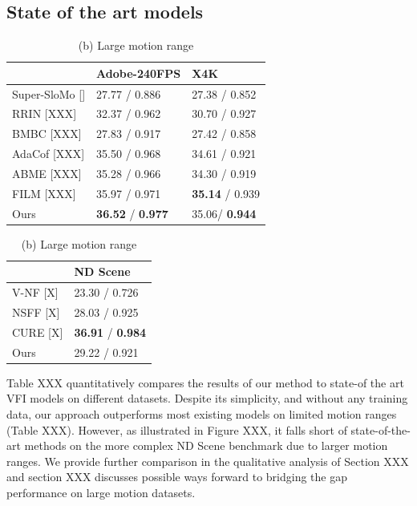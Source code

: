\documentclass{article}
\begin{document}
\subsection{State of the art models}
\label{sec_sota}

\begin{table}[!hb]
    \caption{Quantitative comparison to state-of-the-art VFI on Standard benchmarks. Results are formatted as PSNR / SSMI.}
    \begin{minipage}{.5\linewidth}
      \centering
      \caption*{(a) Limited motion range}
      \begin{tabular}[t]{l | l | l }
       &  Adobe-240FPS &  X4K  \\
      \hline
      Super-SloMo [] &  27.77 / 0.886 & 27.38 / 0.852  \\
      RRIN [XXX]  & 32.37 / 0.962 & 30.70 / 0.927  \\
      BMBC [XXX]  & 27.83 / 0.917 & 27.42 / 0.858   \\
      AdaCof [XXX] & 35.50 / 0.968 & 34.61 / 0.921 \\
      ABME   [XXX] & 35.28 / 0.966 & 34.30 / 0.919 \\
      FILM   [XXX] &	35.97 / 0.971 & \textbf{35.14} / 0.939 \\
      Ours	& \textbf{36.52} / \textbf{0.977} & 35.06/ \textbf{0.944} \\
      \end{tabular}
    \end{minipage}%
    \begin{minipage}{.5\linewidth}
      \centering
      \caption*{(b) Large motion range}
        \begin{tabular}[t]{l | l }
        	    &   ND Scene  \\
        \hline
        V-NF [X]   &  23.30 / 0.726 \\
        NSFF [X]   & 28.03 / 0.925 \\
        CURE [X]   & \textbf{36.91} / \textbf{0.984} \\
        Ours	     & 29.22 / 0.921
        \end{tabular}
    \end{minipage}
\end{table}

Table XXX quantitatively compares the results of our method to state-of the art VFI models on different datasets.
Despite its simplicity, and without any training data, our approach outperforms most existing models on limited motion ranges (Table XXX).
However, as illustrated in Figure XXX, it falls short of state-of-the-art methods on the more complex ND Scene benchmark due to larger motion ranges.
We provide further comparison in the qualitative analysis of Section XXX and section XXX discusses possible ways forward
to bridging the gap performance on large motion datasets.
\end{document}
